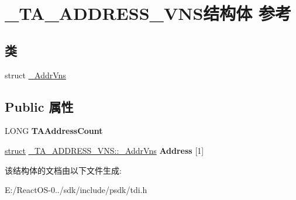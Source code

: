 \hypertarget{struct___t_a___a_d_d_r_e_s_s___v_n_s}{}\section{\+\_\+\+T\+A\+\_\+\+A\+D\+D\+R\+E\+S\+S\+\_\+\+V\+N\+S结构体 参考}
\label{struct___t_a___a_d_d_r_e_s_s___v_n_s}
\subsection*{类}
\begin{DoxyCompactItemize}
\item 
struct \hyperlink{struct___t_a___a_d_d_r_e_s_s___v_n_s_1_1___addr_vns}{\+\_\+\+Addr\+Vns}
\end{DoxyCompactItemize}
\subsection*{Public 属性}
\begin{DoxyCompactItemize}
\item 
\mbox{\label{struct___t_a___a_d_d_r_e_s_s___v_n_s_aea105513f1384f1dc386a7ce503dcbbf}} 
L\+O\+NG {\bfseries T\+A\+Address\+Count}
\item 
\mbox{\label{struct___t_a___a_d_d_r_e_s_s___v_n_s_a584dfb0866ac999c863e6a4e87cdd0be}} 
\hyperlink{interfacestruct}{struct} \hyperlink{struct___t_a___a_d_d_r_e_s_s___v_n_s_1_1___addr_vns}{\+\_\+\+T\+A\+\_\+\+A\+D\+D\+R\+E\+S\+S\+\_\+\+V\+N\+S\+::\+\_\+\+Addr\+Vns} {\bfseries Address} \mbox{[}1\mbox{]}
\end{DoxyCompactItemize}


该结构体的文档由以下文件生成\+:\begin{DoxyCompactItemize}
\item 
E\+:/\+React\+O\+S-\/0../sdk/include/psdk/tdi.\+h\end{DoxyCompactItemize}
